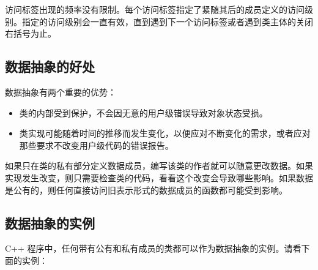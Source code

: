 \documentclass[
]{article}
\providecommand{\tightlist}{%
  \setlength{\itemsep}{0pt}\setlength{\parskip}{0pt}}
\begin{document}
访问标签出现的频率没有限制。每个访问标签指定了紧随其后的成员定义的访问级别。指定的访问级别会一直有效，直到遇到下一个访问标签或者遇到类主体的关闭右括号为止。

\hypertarget{ux6570ux636eux62bdux8c61ux7684ux597dux5904}{%
\subsection{数据抽象的好处}\label{ux6570ux636eux62bdux8c61ux7684ux597dux5904}}

数据抽象有两个重要的优势：

\begin{itemize}
\tightlist
\item
  类的内部受到保护，不会因无意的用户级错误导致对象状态受损。
\item
  类实现可能随着时间的推移而发生变化，以便应对不断变化的需求，或者应对那些要求不改变用户级代码的错误报告。
\end{itemize}

如果只在类的私有部分定义数据成员，编写该类的作者就可以随意更改数据。如果实现发生改变，则只需要检查类的代码，看看这个改变会导致哪些影响。如果数据是公有的，则任何直接访问旧表示形式的数据成员的函数都可能受到影响。

\hypertarget{ux6570ux636eux62bdux8c61ux7684ux5b9eux4f8b}{%
\subsection{数据抽象的实例}\label{ux6570ux636eux62bdux8c61ux7684ux5b9eux4f8b}}

C++
程序中，任何带有公有和私有成员的类都可以作为数据抽象的实例。请看下面的实例：
\end{document}
